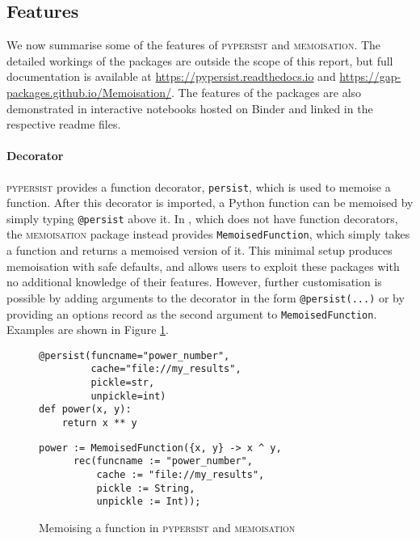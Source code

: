 \documentclass{deliverablereport}
\newcommand{\pypersist}{\textsc{pypersist}}
\newcommand{\Memoisation}{\textsc{memoisation}}
\begin{document}
\subsection{Features}
\label{sec:features}

We now summarise some of the features of \pypersist{} and \Memoisation{}.  The
detailed workings of the packages are outside the scope of this report, but full
documentation is available at \url{https://pypersist.readthedocs.io} and
\url{https://gap-packages.github.io/Memoisation/}.  The features of the packages
are also demonstrated in interactive notebooks hosted on Binder and linked in
the respective readme files.

\paragraph{Decorator}
\pypersist{} provides a function decorator, \texttt{persist}, which is used to
memoise a function.  After this decorator is imported, a Python function can be
memoised by simply typing \texttt{@persist} above it.  In \GAP, which does not
have function decorators, the \Memoisation{} package instead provides
\texttt{MemoisedFunction}, which simply takes a function and returns a memoised
version of it.  This minimal setup produces memoisation with safe defaults, and
allows users to exploit these packages with no additional knowledge of their
features.  However, further customisation is possible by adding arguments to the
decorator in the form \texttt{@persist(...)} or by providing an options record
as the second argument to \texttt{MemoisedFunction}.  Examples are shown in
Figure \ref{fig:how-to-call}.

\begin{figure}[h]
  \centering
  \begin{minipage}[t]{.45\textwidth}
    {\tiny
    \begin{verbatim}
@persist(funcname="power_number",
         cache="file://my_results",
         pickle=str,
         unpickle=int)
def power(x, y):
    return x ** y
    \end{verbatim}
    }
  \end{minipage}
  \quad
  \begin{minipage}[t]{.45\textwidth}
    {\tiny
    \begin{verbatim}
power := MemoisedFunction({x, y} -> x ^ y,
      rec(funcname := "power_number",
          cache := "file://my_results",
          pickle := String,
          unpickle := Int));
    \end{verbatim}
    }
  \end{minipage}
  \caption{Memoising a function in \pypersist{} and \Memoisation{}}
  \label{fig:how-to-call}
\end{figure}
\end{document}

